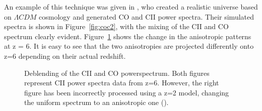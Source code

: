 \documentclass[manuscript]{aastex}
\begin{document}

An example of this technique was given in \cite{Cheng2016}, who created a realistic universe based on $\Lambda CDM$ cosmology and generated CO and CII power spectra. Their simulated spectra is shown in Figure~\ref{fig:coc2}, with the mixing of the CII and CO spectrum clearly evident. Figure~\ref{fig:cheng1} shows the change in the anisotropic patterns at z = 6. It is easy to see that the two anisotropies are projected differently onto z=6 depending on their actual redshift.

\begin{figure}[h!]
    \centering
    \qquad
    \singlespace
    \caption[Deblending of the CII and CO power spectrums. -(\cite{Cheng2016})]{Deblending of the CII and CO powerspectrum. Both figures represent CII power spectra data from z=6. However, the right figure has been incorrectly processed using a z=2 model, changing the uniform spectrum to an anisotropic one (\cite{Cheng2016}).}%
    \label{fig:cheng1}%
\end{figure}
\end{document}
